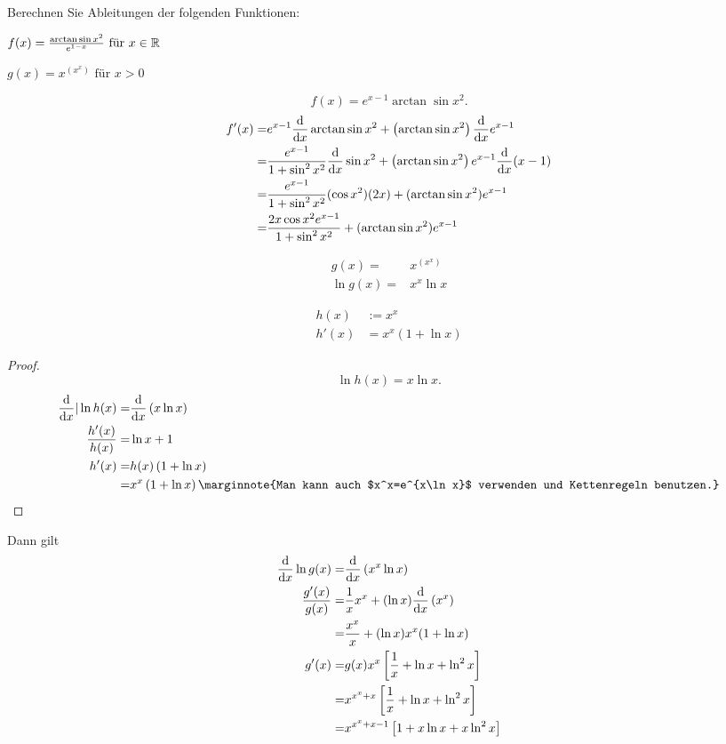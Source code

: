 \begin{Problem}
Berechnen Sie Ableitungen der folgenden Funktionen:
\begin{parts}
	\item $f(x)=\frac{\arctan\sin x^2}{e^{1-x}}\text{ f\"{u}r }x\in \mathbb{R}$ 
	\item $g(x)=x^{(x^x)}\text{ f\"{u}r }x>0$
\end{parts}
\end{Problem}

	\begin{parts}
		\item 
			\[
				f(x)=e^{x-1}\arctan\sin x^2
			.\] 
			\begin{align*}
				f'(x)=& e^{x-1}\dv{x}\arctan\sin x^2+\left( \arctan\sin x^2 \right) \dv{x}e^{x-1}\\
			=&\frac{e^{x-1}}{1+\sin^2 x^2}\dv{x}\sin x^2+\left( \arctan\sin x^2 \right)e^{x-1}\dv{x}(x-1)\\
			=&\frac{e^{x-1}}{1+\sin^2 x^2}(\cos x^2)(2x)+(\arctan\sin x^2)e^{x-1}\\
			=& \frac{2x\cos x^2 e^{x-1}}{1+\sin^2 x^2}+(\arctan\sin x^2)e^{x-1}
			\end{align*}
		\item 
			\begin{align*}
				g(x)=& x^{(x^x)}\\
				\ln g(x)=& x^x\ln x
			\end{align*}

			\begin{Lemma}
				\begin{align*}
					h(x)&:=x^x\\
					h'(x)&=x^x(1+\ln x)
				\end{align*}
			\end{Lemma}
			\begin{proof}
				\[
				\ln h(x)=x\ln x
				.\] 
				\begin{align*}
					\dv{x}|\ln h(x)=&\dv{x}\left( x\ln x \right) \\
					\frac{h'(x)}{h(x)}=&\ln x+1\\
					h'(x)=&h(x)\left( 1+\ln x \right) \\
					=&x^x\left( 1+\ln x \right) \marginnote{Man kann auch $x^x=e^{x\ln x}$ verwenden und Kettenregeln benutzen.}
				\end{align*}
			\end{proof}
			Dann gilt
	\begin{align*}
		\dv{x}\ln g(x)=&\dv{x}\left( x^x \ln x \right) \\
		\frac{g'(x)}{g(x)}=&\frac{1}{x}x^x+(\ln x)\dv{x}\left( x^x \right) \\
		=&\frac{x^x}{x}+(\ln x)x^x (1+\ln x)\\
		g'(x)=&g(x)x^x\left[ \frac{1}{x}+\ln x+\ln^2x \right] \\
		=& x^{x^x+x}\left[ \frac{1}{x}+\ln x+\ln^2x \right] \\
		=& x^{x^x+x-1}\left[ 1+x\ln x+x\ln^2 x \right] 
	\end{align*}
		\end{parts}

